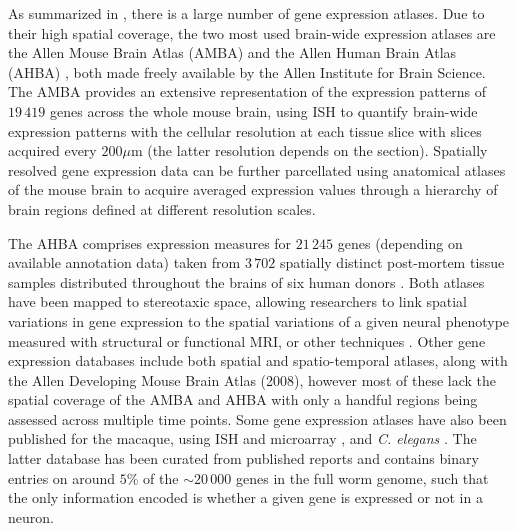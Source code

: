 As summarized in \citet{Keil2018}, there is a large number of gene expression atlases. 
Due to their high spatial coverage, the two most used brain-wide expression atlases are the Allen Mouse Brain Atlas (AMBA) \citep{Lein2007a} and the Allen Human Brain Atlas (AHBA) \citep{Hawrylycz2012}, both made freely available by the Allen Institute for Brain Science.
The AMBA provides an extensive representation of the expression patterns of $19\,419$ genes across the whole mouse brain, using ISH to quantify brain-wide expression patterns with the cellular resolution at each tissue slice with slices acquired every $200\mu$m (the latter resolution depends on the section). 
Spatially resolved gene expression data can be further parcellated using anatomical atlases of the mouse brain \citep{Johnson2010,Furth2018} to acquire averaged expression values through a hierarchy of brain regions defined at different resolution scales.

The AHBA comprises expression measures for $21\,245$ genes (depending on available annotation data) taken from $3\,702$ spatially distinct post-mortem tissue samples distributed throughout the brains of six human donors \citep{Hawrylycz2012,Hawrylycz2015}. 
Both atlases have been mapped to stereotaxic space, allowing researchers to link spatial variations in gene expression to the spatial variations of a given neural phenotype measured with structural or functional MRI, or other techniques \citep{Furth2018}. 
Other gene expression databases include both spatial \citep{Fertuzinhos2014} and spatio-temporal \citep{Ayoub2011,Belgard2011,Colantuoni2011,Miller2014} atlases, along with the Allen Developing Mouse Brain Atlas (2008), however most of these lack the spatial coverage of the AMBA and AHBA with only a handful regions being assessed across multiple time points. Some gene expression atlases have also been published for the macaque, using ISH and microarray \citep{Bakken2016}, and \textit{C. elegans} \citep{Harris2010}. 
The latter database has been curated from published reports and contains binary entries on around $5$\% of the $\sim20\,000$ genes in the full worm genome, such that the only information encoded is whether a given gene is expressed or not in a neuron.

